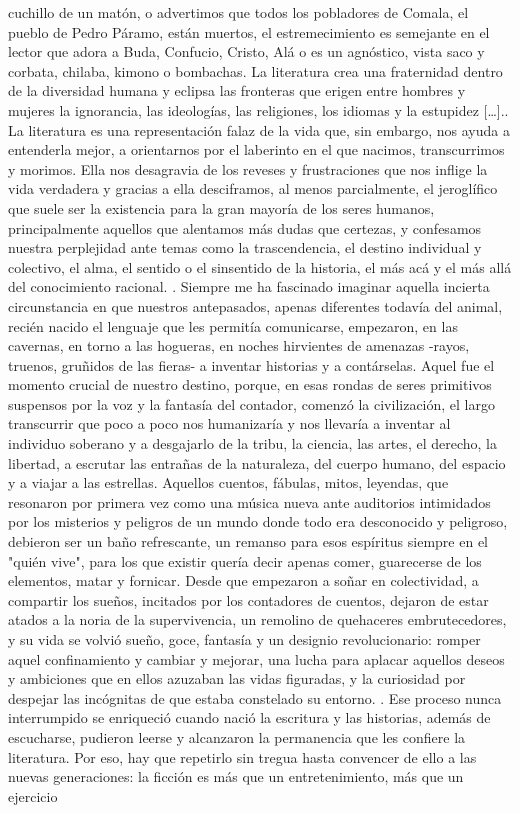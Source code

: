 \documentclass[a4paper,12pt]{article}\usepackage[spanish]{babel}\usepackage{times}
\begin{document}
cuchillo de un matón, o advertimos que todos los pobladores de Comala, el pueblo de Pedro Páramo, están muertos, el estremecimiento es semejante en el lector que adora a Buda, Confucio, Cristo, Alá o es un agnóstico, vista saco y corbata, chilaba, kimono o bombachas. La literatura crea una fraternidad dentro de la diversidad humana y eclipsa las fronteras que erigen entre hombres y mujeres la ignorancia, las ideologías, las religiones, los idiomas y la estupidez […].. La literatura es una representación falaz de la vida que, sin embargo, nos ayuda a entenderla mejor, a orientarnos por el laberinto en el que nacimos, transcurrimos y morimos. Ella nos desagravia de los reveses y frustraciones que nos inflige la vida verdadera y gracias a ella desciframos, al menos parcialmente, el jeroglífico que suele ser la existencia para la gran mayoría de los seres humanos, principalmente aquellos que alentamos más dudas que certezas, y confesamos nuestra perplejidad ante temas como la trascendencia, el destino individual y colectivo, el alma, el sentido o el sinsentido de la historia, el más acá y el más allá del conocimiento racional. . Siempre me ha fascinado imaginar aquella incierta circunstancia en que nuestros antepasados, apenas diferentes todavía del animal, recién nacido el lenguaje que les permitía comunicarse, empezaron, en las cavernas, en torno a las hogueras, en noches hirvientes de amenazas -rayos, truenos, gruñidos de las fieras- a inventar historias y a contárselas. Aquel fue el momento crucial de nuestro destino, porque, en esas rondas de seres primitivos suspensos por la voz y la fantasía del contador, comenzó la civilización, el largo transcurrir que poco a poco nos humanizaría y nos llevaría a inventar al individuo soberano y a desgajarlo de la tribu, la ciencia, las artes, el derecho, la libertad, a escrutar las entrañas de la naturaleza, del cuerpo humano, del espacio y a viajar a las estrellas. Aquellos cuentos, fábulas, mitos, leyendas, que resonaron por primera vez como una música nueva ante auditorios intimidados por los misterios y peligros de un mundo donde todo era desconocido y peligroso, debieron ser un baño refrescante, un remanso para esos espíritus siempre en el "quién vive", para los que existir quería decir apenas comer, guarecerse de los elementos, matar y fornicar. Desde que empezaron a soñar en colectividad, a compartir los sueños, incitados por los contadores de cuentos, dejaron de estar atados a la noria de la supervivencia, un remolino de quehaceres embrutecedores, y su vida se volvió sueño, goce, fantasía y un designio revolucionario: romper aquel confinamiento y cambiar y mejorar, una lucha para aplacar aquellos deseos y ambiciones que en ellos azuzaban las vidas figuradas, y la curiosidad por despejar las incógnitas de que estaba constelado su entorno. . Ese proceso nunca interrumpido se enriqueció cuando nació la escritura y las historias, además de escucharse, pudieron leerse y alcanzaron la permanencia que les confiere la literatura. Por eso, hay que repetirlo sin tregua hasta convencer de ello a las nuevas generaciones: la ficción es más que un entretenimiento, más que un ejercicio 
\end{document}
